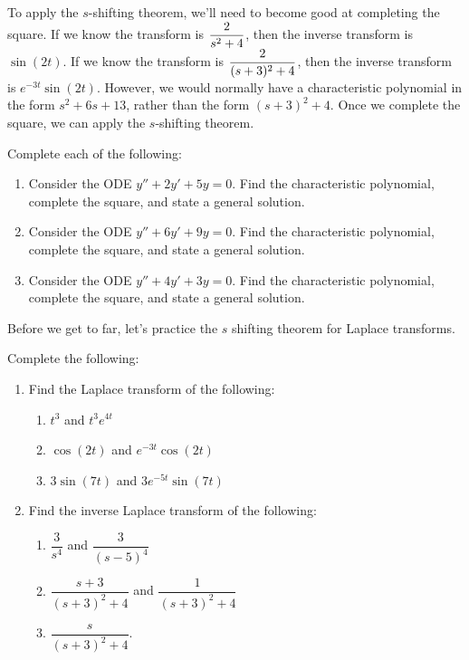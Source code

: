 To apply the $s$-shifting theorem, we'll need to become good at completing the square.  
If we know the transform is $\displaystyle\frac{2}{s^2+4}$, then the inverse transform is $\sin(2t)$. 
If we know the transform is $\displaystyle\frac{2}{(s+3)^2+4}$, then the inverse transform is $e^{-3t}\sin(2t)$. 
However, we would normally have a characteristic polynomial in the form $s^2+6s+13$, rather than the form $(s+3)^2+4$. 
Once we complete the square, we can apply the $s$-shifting theorem.

\begin{problem}
Complete each of the following:
\begin{enumerate}
 \item Consider the ODE $y''+2y'+5y=0$. Find the characteristic polynomial, complete the square, and state a general solution.
 \item Consider the ODE $y''+6y'+9y=0$. Find the characteristic polynomial, complete the square, and state a general solution.  
 \item Consider the ODE $y''+4y'+3y=0$. Find the characteristic polynomial, complete the square, and state a general solution.  
\end{enumerate}
\end{problem}

Before we get to far, let's practice the $s$ shifting theorem for Laplace transforms.
\begin{problem*}[5.16 and 1/2]
 Complete the following:
\begin{enumerate}
 \item Find the Laplace transform of the following:
\begin{enumerate}
 \item $t^3$ and $ t^3 e^{4t}$
 \item $\cos(2t)$ and $e^{-3t}\cos(2t)$
 \item $3\sin(7t)$ and $3e^{-5t}\sin(7t)$ 
\end{enumerate}
 \item Find the inverse Laplace transform of the following:
\begin{enumerate}
 \item $\dfrac{3}{s^4}$ and $\dfrac{3}{(s-5)^4}$
 \item $\dfrac{s+3}{(s+3)^2+4}$ and $\dfrac{1}{(s+3)^2+4}$
 \item $\dfrac{s}{(s+3)^2+4}$.
\end{enumerate}
\end{enumerate}

\end{problem*}



